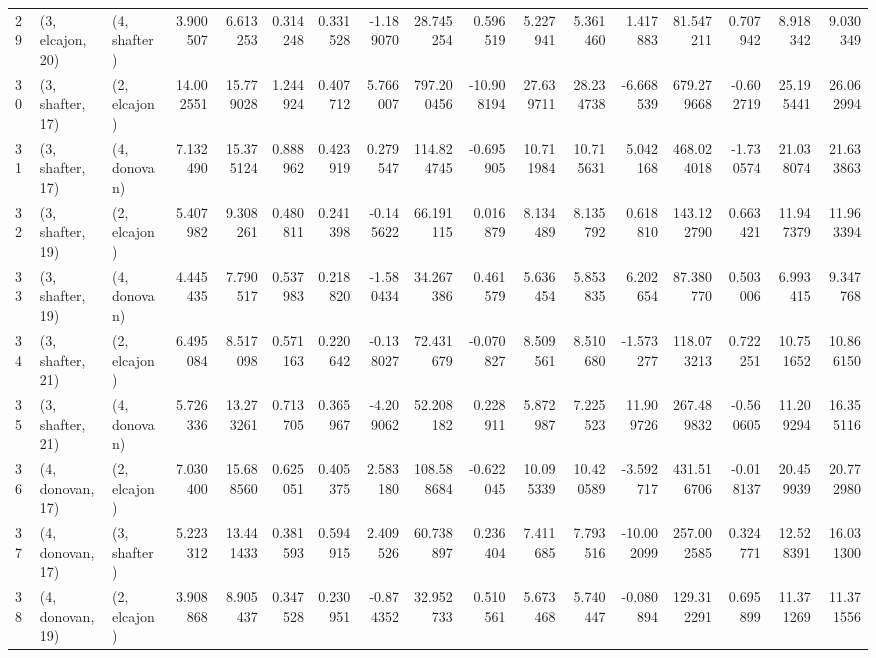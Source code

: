 \begin{tabular}{lllrrrrrrrrrrrrrr}
29 &  (3, elcajon, 20) &     (4, shafter) &   3.900507 &   6.613253 &   0.314248 &  0.331528 &  -1.189070 &    28.745254 &   0.596519 &   5.227941 &   5.361460 &   1.417883 &    81.547211 &  0.707942 &   8.918342 &   9.030349 \\
30 &  (3, shafter, 17) &     (2, elcajon) &  14.002551 &  15.779028 &   1.244924 &  0.407712 &   5.766007 &   797.200456 & -10.908194 &  27.639711 &  28.234738 &  -6.668539 &   679.279668 & -0.602719 &  25.195441 &  26.062994 \\
31 &  (3, shafter, 17) &     (4, donovan) &   7.132490 &  15.375124 &   0.888962 &  0.423919 &   0.279547 &   114.824745 &  -0.695905 &  10.711984 &  10.715631 &   5.042168 &   468.024018 & -1.730574 &  21.038074 &  21.633863 \\
32 &  (3, shafter, 19) &     (2, elcajon) &   5.407982 &   9.308261 &   0.480811 &  0.241398 &  -0.145622 &    66.191115 &   0.016879 &   8.134489 &   8.135792 &   0.618810 &   143.122790 &  0.663421 &  11.947379 &  11.963394 \\
33 &  (3, shafter, 19) &     (4, donovan) &   4.445435 &   7.790517 &   0.537983 &  0.218820 &  -1.580434 &    34.267386 &   0.461579 &   5.636454 &   5.853835 &   6.202654 &    87.380770 &  0.503006 &   6.993415 &   9.347768 \\
34 &  (3, shafter, 21) &     (2, elcajon) &   6.495084 &   8.517098 &   0.571163 &  0.220642 &  -0.138027 &    72.431679 &  -0.070827 &   8.509561 &   8.510680 &  -1.573277 &   118.073213 &  0.722251 &  10.751652 &  10.866150 \\
35 &  (3, shafter, 21) &     (4, donovan) &   5.726336 &  13.273261 &   0.713705 &  0.365967 &  -4.209062 &    52.208182 &   0.228911 &   5.872987 &   7.225523 &  11.909726 &   267.489832 & -0.560605 &  11.209294 &  16.355116 \\
36 &  (4, donovan, 17) &     (2, elcajon) &   7.030400 &  15.688560 &   0.625051 &  0.405375 &   2.583180 &   108.588684 &  -0.622045 &  10.095339 &  10.420589 &  -3.592717 &   431.516706 & -0.018137 &  20.459939 &  20.772980 \\
37 &  (4, donovan, 17) &     (3, shafter) &   5.223312 &  13.441433 &   0.381593 &  0.594915 &   2.409526 &    60.738897 &   0.236404 &   7.411685 &   7.793516 & -10.002099 &   257.002585 &  0.324771 &  12.528391 &  16.031300 \\
38 &  (4, donovan, 19) &     (2, elcajon) &   3.908868 &   8.905437 &   0.347528 &  0.230951 &  -0.874352 &    32.952733 &   0.510561 &   5.673468 &   5.740447 &  -0.080894 &   129.312291 &  0.695899 &  11.371269 &  11.371556 \\

\end{tabular}
